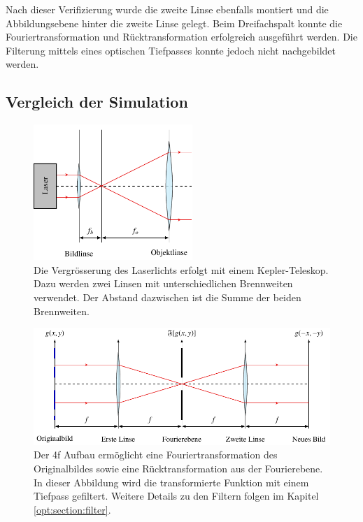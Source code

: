 Nach dieser Verifizierung wurde die zweite Linse ebenfalls montiert und die Abbildungsebene hinter die zweite Linse gelegt.
Beim Dreifachspalt konnte die Fouriertransformation und Rücktransformation erfolgreich ausgeführt werden.
Die Filterung mittels eines optischen Tiefpasses konnte jedoch nicht nachgebildet werden.

\subsection{Vergleich der Simulation}

\begin{figure}
    \centering
    \includegraphics[width=60mm]{papers/opt/images/laserAufweiten.pdf}
    \caption{Die Vergrösserung des Laserlichts erfolgt mit einem Kepler-Teleskop.
        Dazu werden zwei Linsen mit unterschiedlichen Brennweiten verwendet.
        Der Abstand dazwischen ist die Summe der beiden Brennweiten.}
    \label{opt:fig:laserAufweiten}
\end{figure}

\begin{figure}
    \centering
    \includegraphics[width=\textwidth]{papers/opt/images/4fAufbau.pdf}
    \caption{Der 4f Aufbau ermöglicht eine Fouriertransformation des Originalbildes sowie eine Rücktransformation aus der Fourierebene.
    In dieser Abbildung wird die transformierte Funktion mit einem Tiefpass gefiltert.
    Weitere Details zu den Filtern folgen im Kapitel \ref{opt:section:filter}.}
    \label{opt:fig:4fAufbau}
\end{figure}
